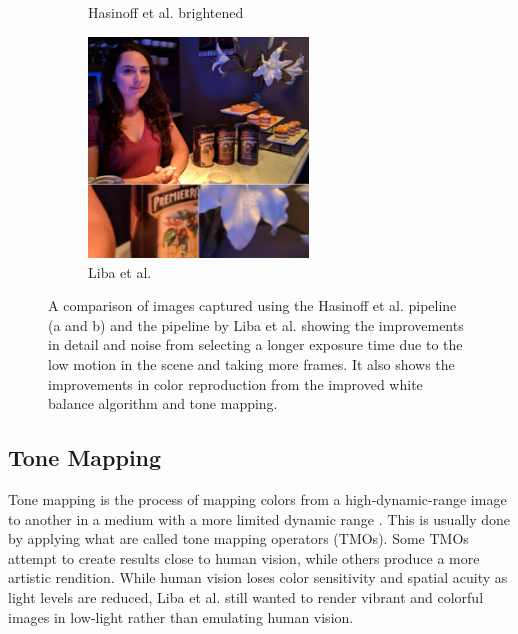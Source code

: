\documentclass{sig-alternate}
\begin{document}
\begin{figure}
\begin{subfigure}{13.8pc}
\caption{Hasinoff et al. brightened}
\label{fig:libaResults:Hasinoff}
\end{subfigure}
\begin{subfigure}{13.8pc}
\centering
\includegraphics[width=13.8pc]{figures/liba2019-figure-1c-95quality.jpg}
\caption{Liba et al.}
\label{fig:libaResults:liba}
\end{subfigure}

\caption{A comparison of images captured using the Hasinoff et al. pipeline (a and b) and the pipeline by Liba et al. showing the improvements in detail and noise from selecting a longer exposure time due to the low motion in the scene and taking more frames. It also shows the improvements in color reproduction from the improved white balance algorithm and tone mapping.~\cite{Liba2019}}


\label{fig:libaResults}
\end{figure}



\pagebreak

\subsection{Tone Mapping}
\label{sec:toneMapping}


Tone mapping is the process of mapping colors from a high-dynamic-range image to another in a medium with a more limited dynamic range \cite{wiki:ToneMapping}. 
This is usually done by applying what are called tone mapping operators (TMOs). Some TMOs attempt to create results close to human vision, while others produce a more artistic rendition. While human vision loses color sensitivity and spatial acuity as light levels are reduced, Liba et al. still wanted to render vibrant and colorful images in low-light rather than emulating human vision.~
\end{document}
